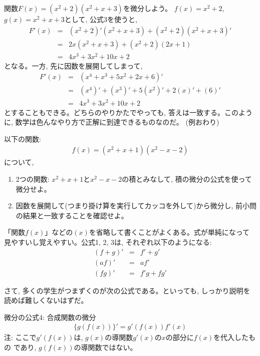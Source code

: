 \begin{exmpl}  関数$F(x)=(x^2+2)(x^2+x+3)$を微分しよう。
$f(x)=x^2+2$, $g(x)=x^2+x+3$として, 公式3を使うと, 
\begin{eqnarray}
F'(x)&=&(x^2+2)'(x^2+x+3)+(x^2+2)(x^2+x+3)'\nonumber\\
     &=&2x(x^2+x+3)+(x^2+2)(2x+1)\nonumber\\
     &=&4x^3+3x^2+10x+2
\end{eqnarray}
となる。一方, 先に因数を展開してしまって, 
\begin{eqnarray}
F'(x)&=&(x^4+x^3+5x^2+2x+6)'\nonumber\\
     &=&(x^4)'+(x^3)'+5(x^2)'+2(x)'+(6)'\nonumber\\
     &=&4x^3+3x^2+10x+2
\end{eqnarray}
とすることもできる。どちらのやりかたでやっても, 答えは一致する。このように, 
数学は色んなやり方で正解に到達できるものなのだ。
(例おわり)\end{exmpl}
\hv

\begin{q}\label{q:diff_func1} 以下の関数:
\begin{eqnarray}f(x)=(x^2+x+1)(x^2-x-2)\end{eqnarray}
について, 
\begin{enumerate}
\item 2つの関数: $x^2+x+1$と$x^2-x-2$の積とみなして, 積の微分の公式を使って微分せよ。
\item 因数を展開して(つまり掛け算を実行してカッコを外して)から微分し, 前小問の結果と一致することを確認せよ。
\end{enumerate}\end{q}
\vspace{0.3cm}

「関数$f(x)$」などの$(x)$を省略して書くことがよくある。式が単純になって
見やすいし覚えやすい。公式1, 2, 3は, それぞれ以下のようになる:
\begin{eqnarray}
(f+g)'&=&f'+g'\\
(af)'&=&af'\\
(fg)'&=&f'g+fg'
\end{eqnarray}

さて, 多くの学生がつまずくのが次の公式である。といっても, しっかり説明を
読めば難しくないはずだ。

\begin{itembox}{微分の公式4: 合成関数の微分}
\begin{eqnarray}
\{g(f(x))\}'=g'(f(x))f'(x)\label{eq:diff_form4}
\end{eqnarray}
注: ここで$g'(f(x))$は, $g(x)$の導関数$g'(x)$の$x$の部分に$f(x)$を代入したもの
であり, $g(f(x))$の導関数ではない。\end{itembox}

